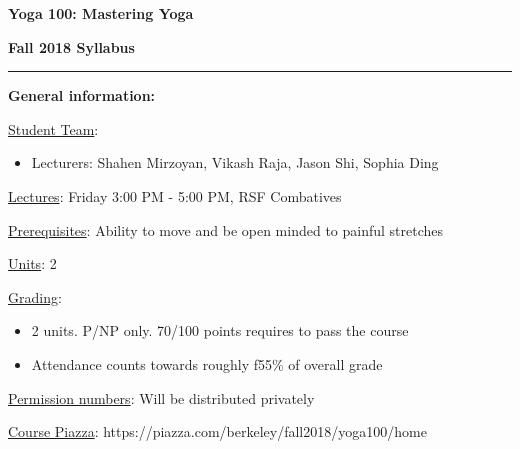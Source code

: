 \documentclass{article}
\begin{document}
\begin{center}

\huge


\textbf{Yoga 100: Mastering Yoga}

\textbf{Fall 2018 Syllabus}


\end{center}

\noindent\rule[0.5ex]{\linewidth}{1pt}


\Large

\begin{flushleft}
\textbf{General information:}

\vspace{0.5cm}

\large

\underline{Student Team}:
\begin{itemize}[noitemsep,nolistsep]
    \item Lecturers: Shahen Mirzoyan, Vikash Raja, Jason Shi, Sophia Ding
\end{itemize}

\vspace{0.1cm}

\underline{Lectures}: Friday 3:00 PM - 5:00 PM, RSF Combatives

\vspace{0.1cm}

\underline{Prerequisites}: Ability to move and be open minded to painful stretches

\vspace{0.1cm}

\underline{Units}: 2

\vspace{0.1cm}

\underline{Grading}:
\vspace{0.1cm}
\begin{itemize}[noitemsep,nolistsep]
    \item 2 units. P/NP only. 70/100 points requires to pass the course
    \item Attendance counts towards roughly f55\% of overall grade
\end{itemize}


\vspace{0.1cm}

\underline{Permission numbers}: Will be distributed privately

\vspace{0.1cm}

\underline{Course Piazza}: https://piazza.com/berkeley/fall2018/yoga100/home


\end{flushleft}
\end{document}
